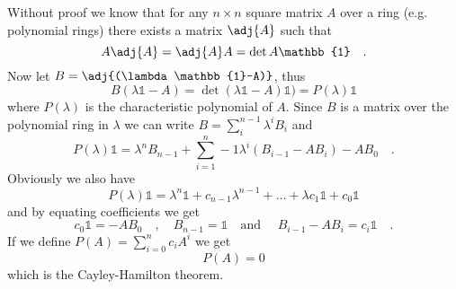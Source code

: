 \begin{theorem} \label{theorem:cayley-hamilton}
Without proof we know that for any $n\times n$ square matrix $A$ over a ring (e.g. 
polynomial rings) there exists a matrix $\adj{A}$ such that
\begin{equation}
A \adj{A} = \adj{A}A = \det{A} \mathbb{1} \quad .
\end{equation}
Now let $B = \adj{(\lambda \mathbb{1}-A)}$, thus
\begin{equation}
B(\lambda \mathbb{1} -A)= \det{(\lambda \mathbb{1}-A)} \mathbb{1} ) = P(\lambda) \mathbb{1}
\end{equation}
where $P(\lambda)$ is the characteristic polynomial of $A$. Since $B$ is a matrix over the 
polynomial ring in $\lambda$ we can write $B = \sum_i^{{n-1}} \lambda^i B_i$ and 
\begin{equation}
P(\lambda) \mathbb{1} = \lambda^n B_{n-1}+ \sum\limits_{i=1}^n-1 \lambda^i \left(B_{i-1}-AB_i \right) - AB_0 \quad .
\end{equation}
Obviously we also have
\begin{equation}
P(\lambda) \mathbb{1} = \lambda^n \mathbb{1} + c_{n-1} \lambda^{n-1} + \ldots + \lambda 
c_1 \mathbb{1} + c_0 \mathbb{1}
\end{equation}
and by equating coefficients we get
\begin{equation}
c_0 \mathbb{1}=-AB_0 \quad , \quad B_{n-1} = \mathbb{1} 
\quad \text{and }\quad B_{i-1}-AB_i = c_i\mathbb{1} \quad .
\end{equation}
If we define $P(A) = \sum_{i=0}^n c_i A^i $ we get
\begin{equation}
P(A) = 0
\end{equation}
which is the Cayley-Hamilton theorem. 
\end{theorem}

